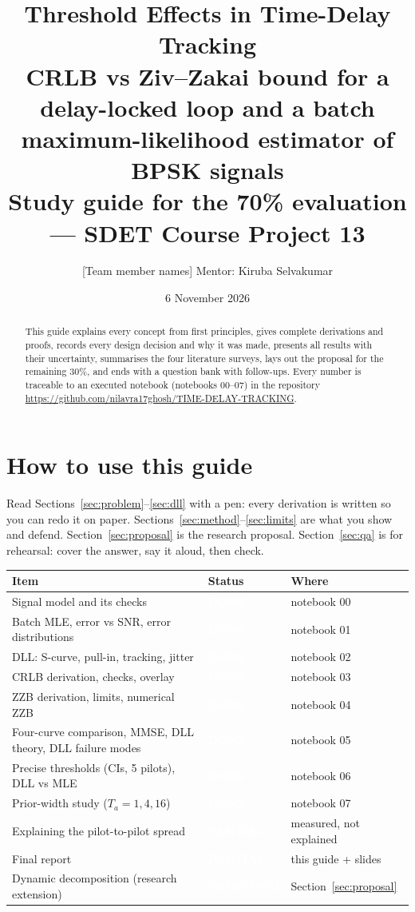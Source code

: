 \documentclass[11pt,a4paper]{article}
\title{\textbf{Threshold Effects in Time-Delay Tracking}\\[4pt]
\large CRLB vs Ziv--Zakai bound for a delay-locked loop and a batch maximum-likelihood estimator of BPSK signals\\[6pt]
\normalsize Study guide for the 70\% evaluation --- SDET Course Project 13}
\author{[Team member names] \quad Mentor: Kiruba Selvakumar}
\date{6 November 2026}
\newcommand{\done}{\colorbox{okgreen}{\textcolor{white}{\scriptsize\bfseries DONE}}}
\newcommand{\partialtag}{\colorbox{orange!80!black}{\textcolor{white}{\scriptsize\bfseries PARTIAL}}}
\newcommand{\prop}{\colorbox{violet!80!black}{\textcolor{white}{\scriptsize\bfseries PROPOSED}}}
\begin{document}
\maketitle
\thispagestyle{empty}

\begin{abstract}
This guide explains every concept from first principles, gives complete derivations and proofs, records every design
decision and why it was made, presents all results with their uncertainty, summarises the four literature surveys,
lays out the proposal for the remaining 30\%, and ends with a question bank with follow-ups. Every number is
traceable to an executed notebook (notebooks 00--07) in the repository
\url{https://github.com/nilavra17ghosh/TIME-DELAY-TRACKING}.
\end{abstract}

\tableofcontents
\newpage

\section*{How to use this guide}
Read Sections~\ref{sec:problem}--\ref{sec:dll} with a pen: every derivation is written so you can redo it on paper.
Sections~\ref{sec:method}--\ref{sec:limits} are what you show and defend. Section~\ref{sec:proposal} is the research
proposal. Section~\ref{sec:qa} is for rehearsal: cover the answer, say it aloud, then check.

\begin{center}
\begin{tabularx}{\textwidth}{>{\raggedright\arraybackslash}X l l}
\toprule
\textbf{Item} & \textbf{Status} & \textbf{Where}\\
\midrule
Signal model and its checks & \done & notebook 00\\
Batch MLE, error vs SNR, error distributions & \done & notebook 01\\
DLL: S-curve, pull-in, tracking, jitter & \done & notebook 02\\
CRLB derivation, checks, overlay & \done & notebook 03\\
ZZB derivation, limits, numerical ZZB & \done & notebook 04\\
Four-curve comparison, MMSE, DLL theory, DLL failure modes & \done & notebook 05\\
Precise thresholds (CIs, 5 pilots), DLL vs MLE & \done & notebook 06\\
Prior-width study ($T_a=1,4,16$) & \done & notebook 07\\
Explaining the pilot-to-pilot spread & \partialtag & measured, not explained\\
Final report & \partialtag & this guide + slides\\
Dynamic decomposition (research extension) & \prop & Section~\ref{sec:proposal}\\
\bottomrule
\end{tabularx}
\end{center}
\end{document}
